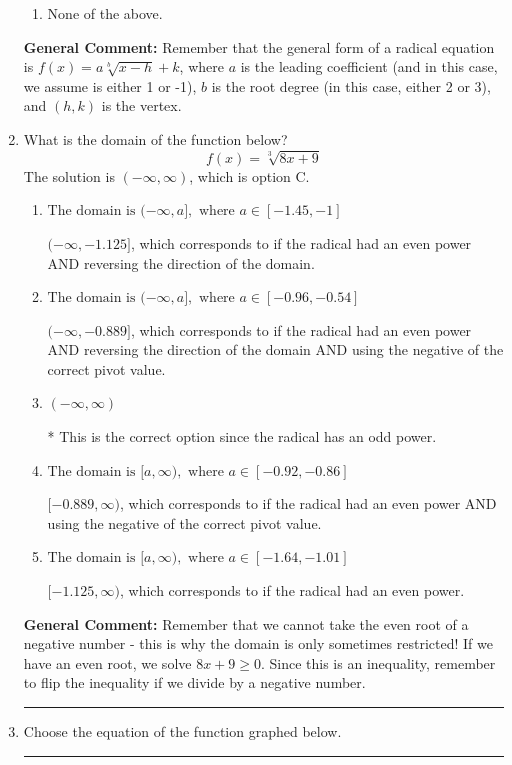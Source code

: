 \documentclass{extbook}[14pt]
\newcommand{\litem}[1]{\item #1

\rule{\textwidth}{0.4pt}}
\begin{document}
\begin{enumerate}
{\begin{enumerate}[label=\Alph*.]
\item None of the above.\end{enumerate}
\textbf{General Comment:} Remember that the general form of a radical equation is $ f(x) = a \sqrt[b]{x - h} + k $, where $a$ is the leading coefficient (and in this case, we assume is either 1 or -1), $b$ is the root degree (in this case, either 2 or 3), and $(h, k)$ is the vertex.
}
\litem{
What is the domain of the function below?
\[ f(x) = \sqrt[3]{8 x + 9} \]The solution is \( (-\infty, \infty) \), which is option C.\begin{enumerate}[label=\Alph*.]
\item \( \text{The domain is } (-\infty, a], \text{   where } a \in [-1.45, -1] \)

$(-\infty, -1.125]$, which corresponds to if the radical had an even power AND reversing the direction of the domain.
\item \( \text{The domain is } (-\infty, a], \text{   where } a \in [-0.96, -0.54] \)

$(-\infty, -0.889]$, which corresponds to if the radical had an even power AND reversing the direction of the domain AND using the negative of the correct pivot value.
\item \( (-\infty, \infty) \)

* This is the correct option since the radical has an odd power.
\item \( \text{The domain is } [a, \infty), \text{   where } a \in [-0.92, -0.86] \)

$[-0.889, \infty)$, which corresponds to if the radical had an even power AND using the negative of the correct pivot value.
\item \( \text{The domain is } [a, \infty), \text{   where } a \in [-1.64, -1.01] \)

$[-1.125, \infty)$, which corresponds to if the radical had an even power.
\end{enumerate}

\textbf{General Comment:} Remember that we cannot take the even root of a negative number - this is why the domain is only sometimes restricted! If we have an even root, we solve $8 x + 9 \geq 0$. Since this is an inequality, remember to flip the inequality if we divide by a negative number.
}
\litem{
Choose the equation of the function graphed below.

}
\end{enumerate}
\end{document}
